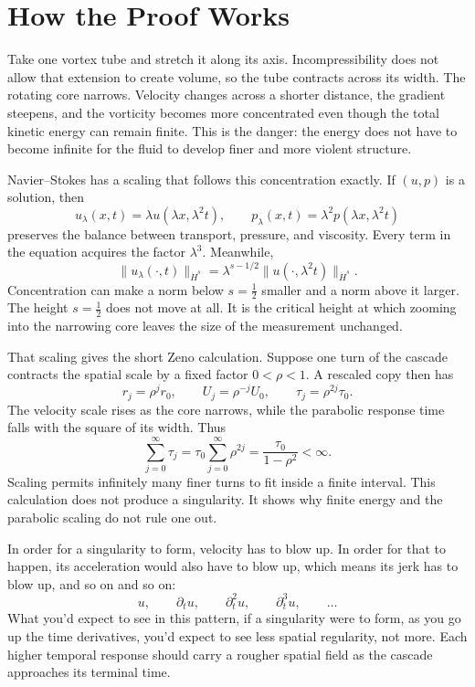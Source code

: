 \section*{How the Proof Works}

Take one vortex tube and stretch it along its axis. Incompressibility does not
allow that extension to create volume, so the tube contracts across its width.
The rotating core narrows. Velocity changes across a shorter distance, the
gradient steepens, and the vorticity becomes more concentrated even though the
total kinetic energy can remain finite. This is the danger: the energy does not
have to become infinite for the fluid to develop finer and more violent
structure.

Navier--Stokes has a scaling that follows this concentration exactly. If
\((u,p)\) is a solution, then
\[
u_\lambda(x,t)=\lambda u(\lambda x,\lambda^2t),
\qquad
p_\lambda(x,t)=\lambda^2p(\lambda x,\lambda^2t)
\]
preserves the balance between transport, pressure, and viscosity. Every term in
the equation acquires the factor \(\lambda^3\). Meanwhile,
\[
\|u_\lambda(\cdot,t)\|_{\dot H^s}
=\lambda^{s-1/2}
  \|u(\cdot,\lambda^2t)\|_{\dot H^s}.
\]
Concentration can make a norm below \(s=\tfrac12\) smaller and a norm above it
larger. The height \(s=\tfrac12\) does not move at all. It is the critical
height at which zooming into the narrowing core leaves the size of the
measurement unchanged.

That scaling gives the short Zeno calculation. Suppose one turn of the
cascade contracts the spatial scale by a fixed factor \(0<\rho<1\). A rescaled
copy then has
\[
r_j=\rho^j r_0,
\qquad
U_j=\rho^{-j}U_0,
\qquad
\tau_j=\rho^{2j}\tau_0.
\]
The velocity scale rises as the core narrows, while the parabolic response time
falls with the square of its width. Thus
\[
\sum_{j=0}^{\infty}\tau_j
=\tau_0\sum_{j=0}^{\infty}\rho^{2j}
=\frac{\tau_0}{1-\rho^2}<\infty.
\]
Scaling permits infinitely many finer turns to fit inside a finite interval.
This calculation does not produce a singularity. It shows why finite energy
and the parabolic scaling do not rule one out.

In order for a singularity to form, velocity has to blow up. In order for that
to happen, its acceleration would also have to blow up, which means its jerk
has to blow up, and so on and so on:
\[
u,\qquad
\partial_tu,\qquad
\partial_t^2u,\qquad
\partial_t^3u,\qquad\ldots
\]
What you'd expect to see in this pattern, if a singularity were to form, as
you go up the time derivatives, you'd expect to see less spatial regularity,
not more. Each higher temporal response should carry a rougher spatial field
as the cascade approaches its terminal time.

